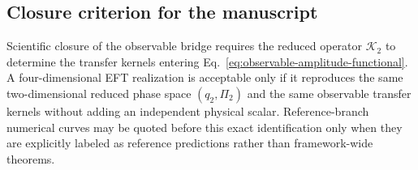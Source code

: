 \subsection{Closure criterion for the manuscript}

Scientific closure of the observable bridge requires the reduced operator
$\mathcal K_2$ to determine the transfer kernels entering
Eq.~\eqref{eq:observable-amplitude-functional}.  A four-dimensional EFT
realization is acceptable only if it reproduces the same two-dimensional
reduced phase space $(q_2,\Pi_2)$ and the same observable transfer kernels
without adding an independent physical scalar.  Reference-branch numerical
curves may be quoted before this exact identification only when they are
explicitly labeled as reference predictions rather than framework-wide
theorems.

